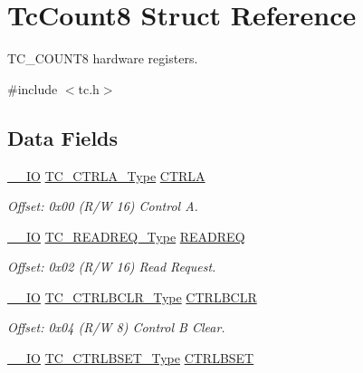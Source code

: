 \hypertarget{struct_tc_count8}{}\section{Tc\+Count8 Struct Reference}
\label{struct_tc_count8}


T\+C\+\_\+\+C\+O\+U\+N\+T8 hardware registers.  




{\ttfamily \#include $<$tc.\+h$>$}

\subsection*{Data Fields}
\begin{DoxyCompactItemize}
\item 
\mbox{\hyperlink{core__cm0plus_8h_aec43007d9998a0a0e01faede4133d6be}{\+\_\+\+\_\+\+IO}} \mbox{\hyperlink{union_t_c___c_t_r_l_a___type}{T\+C\+\_\+\+C\+T\+R\+L\+A\+\_\+\+Type}} \mbox{\hyperlink{struct_tc_count8_a282ae6be6071506774ed492a00c9a7c5}{C\+T\+R\+LA}}
\begin{DoxyCompactList}\small\item\em Offset\+: 0x00 (R/W 16) Control A. \end{DoxyCompactList}\item 
\mbox{\hyperlink{core__cm0plus_8h_aec43007d9998a0a0e01faede4133d6be}{\+\_\+\+\_\+\+IO}} \mbox{\hyperlink{union_t_c___r_e_a_d_r_e_q___type}{T\+C\+\_\+\+R\+E\+A\+D\+R\+E\+Q\+\_\+\+Type}} \mbox{\hyperlink{struct_tc_count8_a9cb0a3ec797bc9e4a1b1db94d2865b34}{R\+E\+A\+D\+R\+EQ}}
\begin{DoxyCompactList}\small\item\em Offset\+: 0x02 (R/W 16) Read Request. \end{DoxyCompactList}\item 
\mbox{\hyperlink{core__cm0plus_8h_aec43007d9998a0a0e01faede4133d6be}{\+\_\+\+\_\+\+IO}} \mbox{\hyperlink{union_t_c___c_t_r_l_b_c_l_r___type}{T\+C\+\_\+\+C\+T\+R\+L\+B\+C\+L\+R\+\_\+\+Type}} \mbox{\hyperlink{struct_tc_count8_a5d266ecd4b84c85e2136fcdfcdd1e57f}{C\+T\+R\+L\+B\+C\+LR}}
\begin{DoxyCompactList}\small\item\em Offset\+: 0x04 (R/W 8) Control B Clear. \end{DoxyCompactList}\item 
\mbox{\hyperlink{core__cm0plus_8h_aec43007d9998a0a0e01faede4133d6be}{\+\_\+\+\_\+\+IO}} \mbox{\hyperlink{union_t_c___c_t_r_l_b_s_e_t___type}{T\+C\+\_\+\+C\+T\+R\+L\+B\+S\+E\+T\+\_\+\+Type}} \mbox{\hyperlink{struct_tc_count8_aad77cd2b986ac4f6e8112f1d8ef850a5}{C\+T\+R\+L\+B\+S\+ET}}

\end{DoxyCompactItemize}
